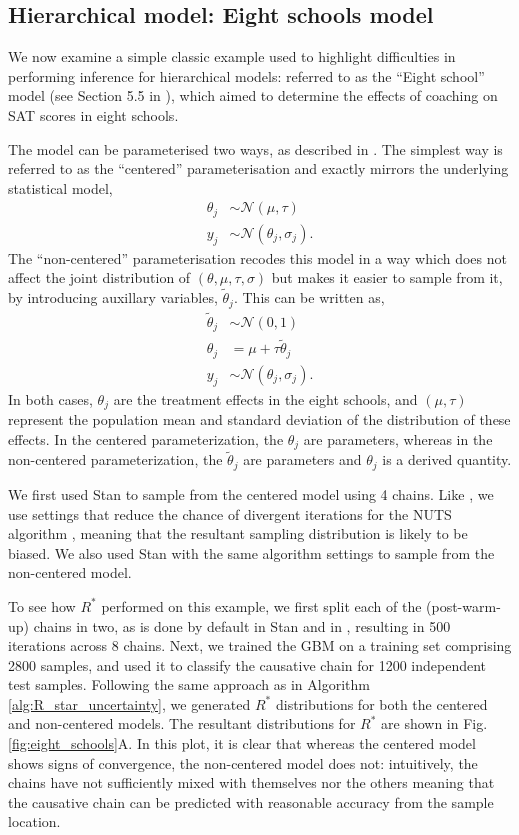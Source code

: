 \documentclass{article}
\newcommand{\N}{\mathcal{N}}
\begin{document}
\subsection{Hierarchical model: Eight schools model}\label{sec:eight_shools}
We now examine a simple classic example used to highlight difficulties in performing inference for hierarchical models: referred to as the ``Eight school'' model (see Section 5.5 in \cite{gelman2013bayesian}), which aimed to determine the effects of coaching on SAT scores in eight schools. 

The model can be parameterised two ways, as described in \cite{vehtari2019rank}. The simplest way is referred to as the ``centered'' parameterisation and exactly mirrors the underlying statistical model,
%
\begin{align*}
\theta_j &\sim \N(\mu, \tau) \\
y_j &\sim \N(\theta_j, \sigma_j).
\end{align*}
%
The ``non-centered'' parameterisation recodes this model in a way which does not affect the joint distribution of $(\theta, \mu, \tau, \sigma)$ but makes it easier to sample from it, by introducing auxillary variables, $\tilde \theta_j$. This can be written as,
%
\begin{align*}
\tilde{\theta}_j &\sim \N(0, 1) \\
\theta_j &= \mu + \tau \tilde{\theta}_j \\
y_j &\sim \N(\theta_j, \sigma_j).
\end{align*}
%
In both cases, $\theta_j$ are the treatment effects in the eight schools, and $(\mu, \tau)$ represent the population mean and standard deviation 
of the distribution of these effects. In the centered parameterization, the $\theta_j$ are parameters, whereas in the non-centered parameterization, the $\tilde{\theta}_j$ are parameters and $\theta_j$ is a derived quantity.

We first used Stan \cite{carpenter2017stan} to sample from the centered model using 4 chains. Like \cite{vehtari2019rank}, we use settings that reduce the chance of divergent iterations for the NUTS algorithm \cite{hoffman2014no}, meaning that the resultant sampling distribution is likely to be biased. We also used Stan with the same algorithm settings to sample from the non-centered model.

To see how $R^*$ performed on this example, we first split each of the (post-warm-up) chains in two, as is done by default in Stan \cite{carpenter2017stan} and in \cite{vehtari2019rank}, resulting in 500 iterations across 8 chains. Next, we trained the GBM on a training set comprising 2800 samples, and used it to classify the causative chain for 1200 independent test samples. Following the same approach as in Algorithm \ref{alg:R_star_uncertainty}, we generated $R^*$ distributions for both the centered and non-centered models. The resultant distributions for $R^*$ are shown in Fig.\ref{fig:eight_schools}A. In this plot, it is clear that whereas the centered model shows signs of convergence, the non-centered model does not: intuitively, the chains have not sufficiently mixed with themselves nor the others meaning that the causative chain can be predicted with reasonable accuracy from the sample location.
\end{document}
